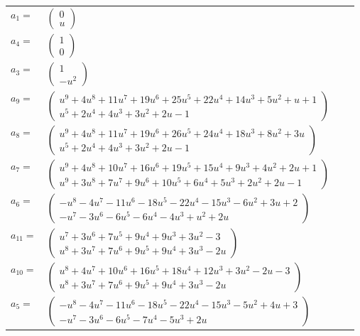 \documentclass[1p]{elsarticle_modified}
\theoremstyle{definition}
\begin{document}
\begin{tabular}{m{7pt} m{180pt} m{7pt} m{180pt} }
\flushright $a_{1}=$&$\begin{pmatrix}0\\u\end{pmatrix}$ \\
\flushright $a_{4}=$&$\begin{pmatrix}1\\0\end{pmatrix}$ \\
\flushright $a_{3}=$&$\begin{pmatrix}1\\- u^2\end{pmatrix}$ \\
\flushright $a_{9}=$&$\begin{pmatrix}u^9+4 u^8+11 u^7+19 u^6+25 u^5+22 u^4+14 u^3+5 u^2+u+1\\u^5+2 u^4+4 u^3+3 u^2+2 u-1\end{pmatrix}$ \\
\flushright $a_{8}=$&$\begin{pmatrix}u^9+4 u^8+11 u^7+19 u^6+26 u^5+24 u^4+18 u^3+8 u^2+3 u\\u^5+2 u^4+4 u^3+3 u^2+2 u-1\end{pmatrix}$ \\
\flushright $a_{7}=$&$\begin{pmatrix}u^9+4 u^8+10 u^7+16 u^6+19 u^5+15 u^4+9 u^3+4 u^2+2 u+1\\u^9+3 u^8+7 u^7+9 u^6+10 u^5+6 u^4+5 u^3+2 u^2+2 u-1\end{pmatrix}$ \\
\flushright $a_{6}=$&$\begin{pmatrix}- u^8-4 u^7-11 u^6-18 u^5-22 u^4-15 u^3-6 u^2+3 u+2\\- u^7-3 u^6-6 u^5-6 u^4-4 u^3+u^2+2 u\end{pmatrix}$ \\
\flushright $a_{11}=$&$\begin{pmatrix}u^7+3 u^6+7 u^5+9 u^4+9 u^3+3 u^2-3\\u^8+3 u^7+7 u^6+9 u^5+9 u^4+3 u^3-2 u\end{pmatrix}$ \\
\flushright $a_{10}=$&$\begin{pmatrix}u^8+4 u^7+10 u^6+16 u^5+18 u^4+12 u^3+3 u^2-2 u-3\\u^8+3 u^7+7 u^6+9 u^5+9 u^4+3 u^3-2 u\end{pmatrix}$ \\
\flushright $a_{5}=$&$\begin{pmatrix}- u^8-4 u^7-11 u^6-18 u^5-22 u^4-15 u^3-5 u^2+4 u+3\\- u^7-3 u^6-6 u^5-7 u^4-5 u^3+2 u\end{pmatrix}$ \\

\end{tabular}
\end{document}
